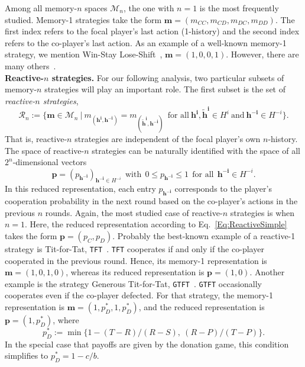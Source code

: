 \documentclass[11pt]{article}
\theoremstyle{plainCl1}
\theoremstyle{plainCl2}
\def\tft{\texttt{TFT}}
\def\gtft{\texttt{GTFT}}
\begin{document}
Among all memory-$n$ spaces $\mathcal{M}_n$, the one with $n\!=\!1$ is the most frequently studied. 
Memory-1 strategies take the form $\mathbf{m}\!=\!(m_{CC}, m_{CD}, m_{DC}, m_{DD})$. 
The first index refers to the focal player's last action (1-history) and the second index refers to the co-player's last action. 
As an example of a well-known memory-1 strategy, we mention Win-Stay Lose-Shift~\citep{nowak:Nature:1993}, $\mathbf{m}\!=\!(1,0,0,1)$. However, there are many others~\citep{hilbe:Nature:2018}.\\


\noindent
{\bfseries Reactive-$n$ strategies.} For our following analysis, two particular subsets of memory-$n$ strategies will play an important role. 
The first subset is the set of {\it reactive-$n$ strategies}, 
\begin{equation}
\mathcal{R}_n:=\Big\{ \mathbf{m}\!\in\!\mathcal{M}_n ~\Big|~ m_{(\mathbf{h^i},\mathbf{h^{-i}})}\!=\!m_{(\mathbf{\tilde{h}^i},\mathbf{h^{-i}})}~~\text{for all}~\mathbf{h^i}, \mathbf{\tilde{h}^i}\!\in\!H^i~\text{and}~\mathbf{h^{-i}}\!\in\!H^{-i}\Big\}.
\end{equation}
That is, reactive-$n$ strategies are independent of the focal player's own $n$-history. 
The space of \mbox{reactive-$n$} strategies can be naturally identified with the space of all $2^n$-dimensional vectors 
\begin{equation}\label{Eq:ReactiveSimple}
\mathbf{p}\!=\!(p_\mathbf{h^{-i}})_{\mathbf{h^{-i}}\in H^{-i}} ~~\text{with}~~ 0\!\le\!p_\mathbf{h^{-i}}\!\le\!1 ~~\text{for all}~~ \mathbf{h^{-i}}\!\in\! H^{-i}.
\end{equation}
In this reduced representation, each entry $p_{\mathbf{h^{-i}}}$ corresponds to the player's cooperation
probability in the next round based on the co-player's actions in the previous
$n$ rounds. 
Again, the most studied case of reactive-$n$ strategies is when $n\!=\!1$.
Here, the reduced representation according to Eq.~\eqref{Eq:ReactiveSimple} takes the form $\mathbf{p}\!=\!(p_C,p_D)$.
Probably the best-known example of a reactive-1 strategy is Tit-for-Tat, \tft~\citep{axelrod:AAAS:1981}. 
\tft{} cooperates if and only if the co-player cooperated in the previous round. 
Hence, its memory-1 representation is $\mathbf{m}\!=\!(1,0,1,0)$, whereas its reduced representation is $\mathbf{p}\!=\!(1,0)$. 
Another example is the strategy Generous Tit-for-Tat, \gtft~\citep{nowak:Nature:1992,molander:jcr:1985}.
\gtft{} occasionally cooperates even if the co-player defected. 
For that strategy, the memory-1 representation is $\mathbf{m}\!=\!(1,p^*_D,1,p^*_D)$, and the reduced representation is $\mathbf{p}\!=\!(1,p^*_D)$, where 
\begin{equation} \label{Eq:ConditionGTFT}
p^*_D\!:=\!\min\big\{1\!-\!(T\!-\!R)/(R\!-\!S),~(R\!-\!P)/(T\!-\!P)\big\}.
\end{equation} 
In the special case that payoffs are given by the donation game, this condition simplifies to $p^*_D\!=\!1-c/b$.\\
\end{document}
